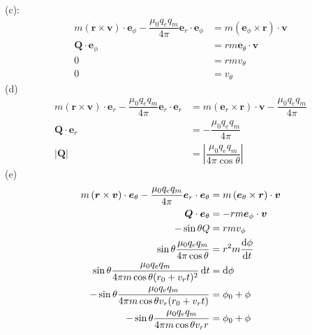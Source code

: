 (c):
\begin{align*}
m\left(\boldsymbol{r}\times\boldsymbol{v}\right)\cdot\boldsymbol{e}_\phi-\dfrac{\mu_0q_eq_m}{4\pi}\boldsymbol{e}_r\cdot\boldsymbol{e}_\phi
&=m\left(\boldsymbol{e}_\phi\times\boldsymbol{r}\right)\cdot\boldsymbol{v}\\
\boldsymbol{Q}\cdot\boldsymbol{e}_\phi&=rm\boldsymbol{e}_\theta \cdot\boldsymbol{v}\\
0&=rmv_\theta\\
0&=v_\theta
\end{align*}
(d)
\begin{align*}
m\left(\boldsymbol{r}\times\boldsymbol{v}\right)\cdot\boldsymbol{e}_r-\dfrac{\mu_0q_eq_m}{4\pi}\boldsymbol{e}_r\cdot\boldsymbol{e}_r
&=m\left(\boldsymbol{e}_r\times\boldsymbol{r}\right)\cdot\boldsymbol{v}
-\dfrac{\mu_0q_eq_m}{4\pi}\\
\boldsymbol{Q}\cdot\boldsymbol{e}_r&=-\dfrac{\mu_0q_eq_m}{4\pi}\\
|\boldsymbol Q|&=\left|\dfrac{\mu_0q_eq_m}{4\pi\cos\theta}\right|
\end{align*}
(e)
\begin{align*}
m\left(\boldsymbol{r}\times\boldsymbol{v}\right)\cdot\boldsymbol{e}_\theta-\dfrac{\mu_0q_eq_m}{4\pi}\boldsymbol{e}_r\cdot\boldsymbol{e}_\theta
&=m\left(\boldsymbol{e}_\theta\times\boldsymbol{r}\right)\cdot\boldsymbol{v}\\
\boldsymbol{Q}\cdot\boldsymbol{e}_\theta&=-rm\boldsymbol{e}_\phi \cdot\boldsymbol{v}\\
-\sin\theta Q&=rmv_\phi\\
\sin\theta \dfrac{\mu_0q_eq_m}{4\pi\cos\theta}&=r^2m\frac{\dif \phi}{\dif t}\\
\sin\theta \dfrac{\mu_0q_eq_m}{4\pi m\cos\theta(r_0+v_rt)^2}\dif t&=\dif \phi\\
-\sin\theta \dfrac{\mu_0q_eq_m}{4\pi m\cos\theta v_r(r_0+v_rt)}&=\phi_0+ \phi\\
-\sin\theta \dfrac{\mu_0q_eq_m}{4\pi m\cos\theta v_rr}&=\phi_0+ \phi
\end{align*}
